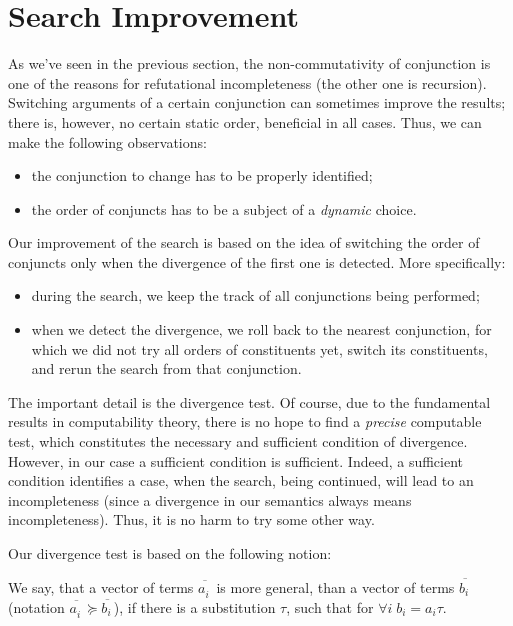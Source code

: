 \section{Search Improvement}
\label{improvement}

As we've seen in the previous section, the non-commutativity of conjunction is one of the reasons for
refutational incompleteness (the other one is recursion). Switching arguments of a certain conjunction
can sometimes improve the results; there is, however, no certain static order,
beneficial in all cases. Thus, we can make the following observations:

\begin{itemize}
\item the conjunction to change has to be properly identified;
\item the order of conjuncts has to be a subject of a \emph{dynamic} choice.
\end{itemize}

Our improvement of the search is based on the idea of switching the order of conjuncts only when
the divergence of the first one is detected. More specifically: 

\begin{itemize}
\item during the search, we keep the track of all conjunctions being performed;
\item when we detect the divergence, we roll back to the nearest conjunction, for which 
we did not try all orders of constituents yet, switch its constituents, and rerun 
the search from that conjunction.
\end{itemize}

The important detail is the divergence test. Of course, due to the fundamental results in computability
theory, there is no hope to find a \emph{precise} computable test, which constitutes the necessary and 
sufficient condition of divergence. However, in our case a sufficient condition is sufficient. Indeed,  
a sufficient condition identifies a case, when the search, being continued, will lead to an incompleteness 
(since a divergence in our semantics always means incompleteness). Thus, it is no harm to try some other way. 

Our divergence test is based on the following notion:

\begin{definition}
\normalfont 
We say, that a vector of terms $\overline{a^{\phantom{x}}_i}$ is more general, than a vector of terms $\overline{b^{\phantom{x}}_i}$ (notation 
$\overline{a^{\phantom{x}}_i}\succeq\overline{b^{\phantom{x}}_i}$), if there is a substitution $\tau$, such that for $\forall i\;b_i = a_i \tau$.
\end{definition}

